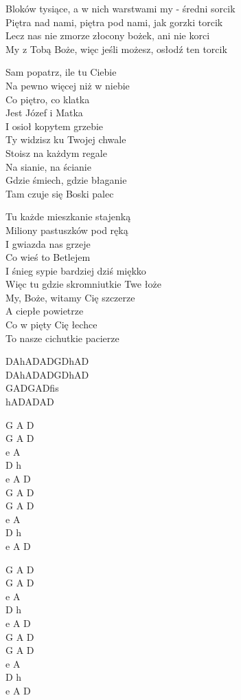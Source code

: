 \begin{text}
    Bloków tysiące, a w nich warstwami my - średni sorcik\\
    Piętra nad nami, piętra pod nami, jak gorzki torcik\\
    Lecz nas nie zmorze złocony bożek, ani nie korci\\
    My z Tobą Boże, więc jeśli możesz, osłodź ten torcik

    Sam popatrz, ile tu Ciebie\\
    Na pewno więcej niż w niebie\\
    Co piętro, co klatka\\
    Jest Józef i Matka\\
    I osioł kopytem grzebie\\
    Ty widzisz ku Twojej chwale\\
    Stoisz na każdym regale\\
    Na sianie, na ścianie\\
    Gdzie śmiech, gdzie błaganie\\
    Tam czuje się Boski palec

    Tu każde mieszkanie stajenką\\
    Miliony pastuszków pod ręką\\
    I gwiazda nas grzeje\\
    Co wieś to Betlejem\\
    I śnieg sypie bardziej dziś miękko\\
    Więc tu gdzie skromniutkie Twe łoże\\
    My, Boże, witamy Cię szczerze\\
    A ciepłe powietrze\\
    Co w pięty Cię łechce\\
    To nasze cichutkie pacierze
\end{text}
\begin{chord}
    DAhADADGDhAD\\
    DAhADADGDhAD\\
    GADGADfis\\
    hADADAD

    G A D\\
    G A D\\
    e A\\
    D h\\
    e A D\\
    G A D\\
    G A D\\
    e A\\
    D h\\
    e A D

    G A D\\
    G A D\\
    e A\\
    D h\\
    e A D\\
    G A D\\
    G A D\\
    e A\\
    D h\\
    e A D
\end{chord}